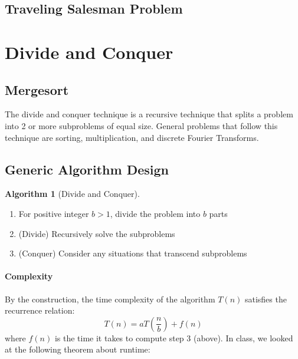 \documentclass[10pt]{article}
\theoremstyle{plain}
\theoremstyle{definition}
\newtheorem{alg}[thm]{Algorithm}
\numberwithin{equation}{section}
\numberwithin{figure}{section}
\begin{document}
\subsection{Traveling Salesman Problem}

\newpage
\section{Divide and Conquer}

\subsection{Mergesort}

The divide and conquer technique is a recursive technique that splits a problem into 2 or more subproblems of equal size. General problems that follow this technique are sorting, multiplication, and discrete Fourier Transforms.

\subsection{Generic Algorithm Design}

\begin{framed}
\begin{alg}[Divide and Conquer] \ \\
\begin{enumerate}
\item For positive integer $b > 1$, divide the problem into $b$ parts
\item (Divide) Recursively solve the subproblems
\item (Conquer) Consider any situations that transcend subproblems
\end{enumerate}
\end{alg}
\end{framed}

\paragraph{Complexity} By the construction, the time complexity of the algorithm $T(n)$ satisfies the recurrence relation: 
\begin{equation}
T(n) = a T\left(\frac{n}{b}\right) + f(n)
\end{equation}
where $f(n)$ is the time it takes to compute step 3 (above). In class, we looked at the following theorem about runtime:
\end{document}
